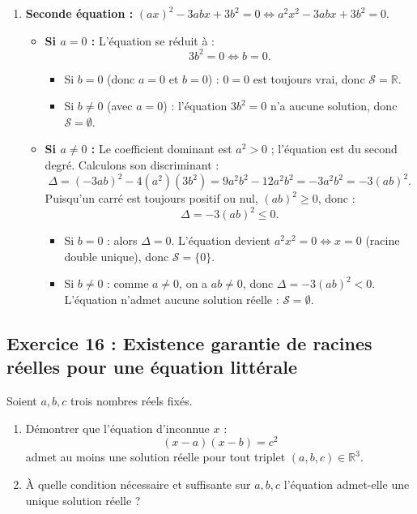 \documentclass[11pt,a4paper]{article}
\newcommand{\R}{\mathbb{R}}
\begin{document}
\begin{correctionbox}
\begin{enumerate}
    \item \textbf{Seconde équation :} $(ax)^2 - 3abx + 3b^2 = 0 \iff a^2 x^2 - 3abx + 3b^2 = 0$.
    \begin{itemize}
        \item \textbf{Si $a = 0$ :} L'équation se réduit à :
        \[
        3b^2 = 0 \iff b = 0.
        \]
        \begin{itemize}
            \item Si $b = 0$ (donc $a = 0$ et $b = 0$) : $0 = 0$ est toujours vrai, donc $\mathcal{S} = \R$.
            \item Si $b \neq 0$ (avec $a = 0$) : l'équation $3b^2 = 0$ n'a aucune solution, donc $\mathcal{S} = \emptyset$.
        \end{itemize}
        \item \textbf{Si $a \neq 0$ :} Le coefficient dominant est $a^2 > 0$ ; l'équation est du second degré.
        Calculons son discriminant :
        \[
        \Delta = (-3ab)^2 - 4(a^2)(3b^2) = 9a^2 b^2 - 12a^2 b^2 = -3a^2 b^2 = -3(ab)^2.
        \]
        Puisqu'un carré est toujours positif ou nul, $(ab)^2 \ge 0$, donc :
        \[
        \Delta = -3(ab)^2 \le 0.
        \]
        \begin{itemize}
            \item Si $b = 0$ : alors $\Delta = 0$. L'équation devient $a^2 x^2 = 0 \iff x = 0$ (racine double unique), donc $\mathcal{S} = \{0\}$.
            \item Si $b \neq 0$ : comme $a \neq 0$, on a $ab \neq 0$, donc $\Delta = -3(ab)^2 < 0$.
            L'équation n'admet aucune solution réelle : $\mathcal{S} = \emptyset$.
        \end{itemize}
    \end{itemize}
\end{enumerate}
\end{correctionbox}

\subsection*{Exercice 16 : Existence garantie de racines réelles pour une équation littérale}
Soient $a, b, c$ trois nombres réels fixés.
\begin{enumerate}
    \item Démontrer que l'équation d'inconnue $x$ :
    \[
    (x-a)(x-b) = c^2
    \]
    admet au moins une solution réelle pour tout triplet $(a, b, c) \in \R^3$.
    \item À quelle condition nécessaire et suffisante sur $a, b, c$ l'équation admet-elle une unique solution réelle ?
\end{enumerate}
\end{document}
